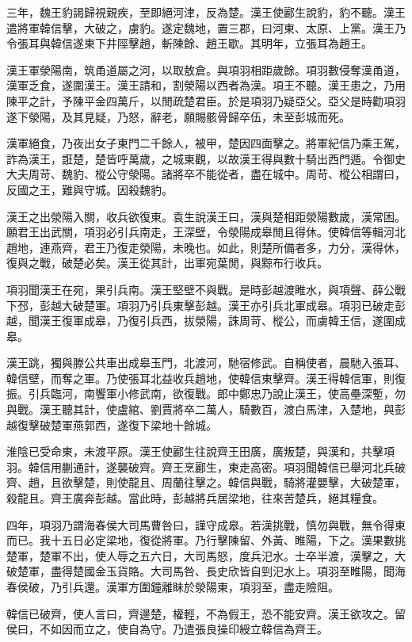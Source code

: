 三年，魏王豹謁歸視親疾，至即絕河津，反為楚。漢王使酈生說豹，豹不聽。漢王遣將軍韓信擊，大破之，虜豹。遂定魏地，置三郡，曰河東、太原、上黨。漢王乃令張耳與韓信遂東下井陘擊趙，斬陳餘、趙王歇。其明年，立張耳為趙王。

漢王軍滎陽南，筑甬道屬之河，以取敖倉。與項羽相距歲餘。項羽數侵奪漢甬道，漢軍乏食，遂圍漢王。漢王請和，割滎陽以西者為漢。項王不聽。漢王患之，乃用陳平之計，予陳平金四萬斤，以閒疏楚君臣。於是項羽乃疑亞父。亞父是時勸項羽遂下滎陽，及其見疑，乃怒，辭老，願賜骸骨歸卒伍，未至彭城而死。

漢軍絕食，乃夜出女子東門二千餘人，被甲，楚因四面擊之。將軍紀信乃乘王駕，詐為漢王，誑楚，楚皆呼萬歲，之城東觀，以故漢王得與數十騎出西門遁。令御史大夫周苛、魏豹、樅公守滎陽。諸將卒不能從者，盡在城中。周苛、樅公相謂曰，反國之王，難與守城。因殺魏豹。

漢王之出滎陽入關，收兵欲復東。袁生說漢王曰，漢與楚相距滎陽數歲，漢常困。願君王出武關，項羽必引兵南走，王深壁，令滎陽成皋閒且得休。使韓信等輯河北趙地，連燕齊，君王乃復走滎陽，未晚也。如此，則楚所備者多，力分，漢得休，復與之戰，破楚必矣。漢王從其計，出軍宛葉閒，與黥布行收兵。

項羽聞漢王在宛，果引兵南。漢王堅壁不與戰。是時彭越渡睢水，與項聲、薛公戰下邳，彭越大破楚軍。項羽乃引兵東擊彭越。漢王亦引兵北軍成皋。項羽已破走彭越，聞漢王復軍成皋，乃復引兵西，拔滎陽，誅周苛、樅公，而虜韓王信，遂圍成皋。

漢王跳，獨與滕公共車出成皋玉門，北渡河，馳宿修武。自稱使者，晨馳入張耳、韓信壁，而奪之軍。乃使張耳北益收兵趙地，使韓信東擊齊。漢王得韓信軍，則復振。引兵臨河，南饗軍小修武南，欲復戰。郎中鄭忠乃說止漢王，使高壘深塹，勿與戰。漢王聽其計，使盧綰、劉賈將卒二萬人，騎數百，渡白馬津，入楚地，與彭越復擊破楚軍燕郭西，遂復下梁地十餘城。

淮陰已受命東，未渡平原。漢王使酈生往說齊王田廣，廣叛楚，與漢和，共擊項羽。韓信用蒯通計，遂襲破齊。齊王烹酈生，東走高密。項羽聞韓信已舉河北兵破齊、趙，且欲擊楚，則使龍且、周蘭往擊之。韓信與戰，騎將灌嬰擊，大破楚軍，殺龍且。齊王廣奔彭越。當此時，彭越將兵居梁地，往來苦楚兵，絕其糧食。

四年，項羽乃謂海春侯大司馬曹咎曰，謹守成皋。若漢挑戰，慎勿與戰，無令得東而已。我十五日必定梁地，復從將軍。乃行擊陳留、外黃、睢陽，下之。漢果數挑楚軍，楚軍不出，使人辱之五六日，大司馬怒，度兵汜水。士卒半渡，漢擊之，大破楚軍，盡得楚國金玉貨賂。大司馬咎、長史欣皆自剄汜水上。項羽至睢陽，聞海春侯破，乃引兵還。漢軍方圍鐘離眛於滎陽東，項羽至，盡走險阻。

韓信已破齊，使人言曰，齊邊楚，權輕，不為假王，恐不能安齊。漢王欲攻之。留侯曰，不如因而立之，使自為守。乃遣張良操印綬立韓信為齊王。

